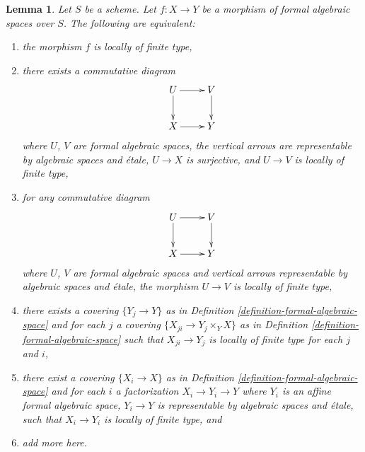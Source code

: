 \documentclass{stacks-project}
\theoremstyle{plain}
\newtheorem{lemma}[subsection]{Lemma}
\theoremstyle{definition}
\theoremstyle{remark}
\numberwithin{equation}{subsection}
\begin{document}
\begin{lemma}
\label{lemma-finite-type-local}
Let $S$ be a scheme. Let $f : X \to Y$ be a morphism of formal algebraic
spaces over $S$. The following are equivalent:
\begin{enumerate}
\item the morphism $f$ is locally of finite type,
\item there exists a commutative diagram
$$
\xymatrix{
U \ar[d] \ar[r] & V \ar[d] \\
X \ar[r] & Y
}
$$
where $U$, $V$ are formal algebraic spaces, the vertical arrows are
representable by algebraic spaces and \'etale, $U \to X$
is surjective, and $U \to V$ is locally of finite type,
\item for any commutative diagram
$$
\xymatrix{
U \ar[d] \ar[r] & V \ar[d] \\
X \ar[r] & Y
}
$$
where $U$, $V$ are formal algebraic spaces and vertical arrows
representable by algebraic spaces and \'etale, the morphism
$U \to V$ is locally of finite type,
\item there exists a covering $\{Y_j \to Y\}$ as in
Definition \ref{definition-formal-algebraic-space}
and for each $j$ a covering $\{X_{ji} \to Y_j \times_Y X\}$ as in
Definition \ref{definition-formal-algebraic-space} such that
$X_{ji} \to Y_j$ is locally of finite type for each $j$ and $i$,
\item there exist a covering $\{X_i \to X\}$ as in
Definition \ref{definition-formal-algebraic-space}
and for each $i$ a factorization $X_i \to Y_i \to Y$ where $Y_i$
is an affine formal algebraic space, $Y_i \to Y$ is representable
by algebraic spaces and \'etale, such that $X_i \to Y_i$ is
locally of finite type, and
\item add more here.
\end{enumerate}
\end{lemma}
\end{document}
